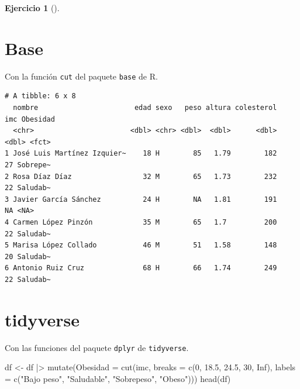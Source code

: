 \documentclass[
  a4paper,
]{scrreport}
\newenvironment{Shaded}{\begin{snugshade}}{\end{snugshade}}
\newcommand{\AttributeTok}[1]{\textcolor[rgb]{0.40,0.45,0.13}{#1}}
\newcommand{\ConstantTok}[1]{\textcolor[rgb]{0.56,0.35,0.01}{#1}}
\newcommand{\DecValTok}[1]{\textcolor[rgb]{0.68,0.00,0.00}{#1}}
\newcommand{\FloatTok}[1]{\textcolor[rgb]{0.68,0.00,0.00}{#1}}
\newcommand{\FunctionTok}[1]{\textcolor[rgb]{0.28,0.35,0.67}{#1}}
\newcommand{\NormalTok}[1]{\textcolor[rgb]{0.00,0.23,0.31}{#1}}
\newcommand{\OtherTok}[1]{\textcolor[rgb]{0.00,0.23,0.31}{#1}}
\newcommand{\SpecialCharTok}[1]{\textcolor[rgb]{0.37,0.37,0.37}{#1}}
\newcommand{\StringTok}[1]{\textcolor[rgb]{0.13,0.47,0.30}{#1}}
\theoremstyle{definition}
\newtheorem{exercise}{Ejercicio}[chapter]
\theoremstyle{remark}
\begin{document}
\begin{exercise}[]
\begin{enumerate}
\begin{tcolorbox}
  \section{Base}

  Con la función \texttt{cut} del paquete \texttt{base} de R.

\begin{Shaded}
\end{Shaded}

\begin{verbatim}
# A tibble: 6 x 8
  nombre                       edad sexo   peso altura colesterol   imc Obesidad
  <chr>                       <dbl> <chr> <dbl>  <dbl>      <dbl> <dbl> <fct>   
1 José Luis Martínez Izquier~    18 H        85   1.79        182    27 Sobrepe~
2 Rosa Díaz Díaz                 32 M        65   1.73        232    22 Saludab~
3 Javier García Sánchez          24 H        NA   1.81        191    NA <NA>    
4 Carmen López Pinzón            35 M        65   1.7         200    22 Saludab~
5 Marisa López Collado           46 M        51   1.58        148    20 Saludab~
6 Antonio Ruiz Cruz              68 H        66   1.74        249    22 Saludab~
\end{verbatim}

  \section{tidyverse}

  Con las funciones del paquete \texttt{dplyr} de \texttt{tidyverse}.

\begin{Shaded}
\begin{Highlighting}[]
\NormalTok{df }\OtherTok{\textless{}{-}}\NormalTok{ df }\SpecialCharTok{|\textgreater{}}
    \FunctionTok{mutate}\NormalTok{(}\AttributeTok{Obesidad =} \FunctionTok{cut}\NormalTok{(imc, }\AttributeTok{breaks =} \FunctionTok{c}\NormalTok{(}\DecValTok{0}\NormalTok{, }\FloatTok{18.5}\NormalTok{, }\FloatTok{24.5}\NormalTok{, }\DecValTok{30}\NormalTok{, }\ConstantTok{Inf}\NormalTok{), }\AttributeTok{labels =} \FunctionTok{c}\NormalTok{(}\StringTok{"Bajo peso"}\NormalTok{, }\StringTok{"Saludable"}\NormalTok{, }\StringTok{"Sobrepeso"}\NormalTok{, }\StringTok{"Obeso"}\NormalTok{)))}
\FunctionTok{head}\NormalTok{(df)}
\end{Highlighting}
\end{Shaded}


\end{tcolorbox}
\end{enumerate}
\end{exercise}
\end{document}
